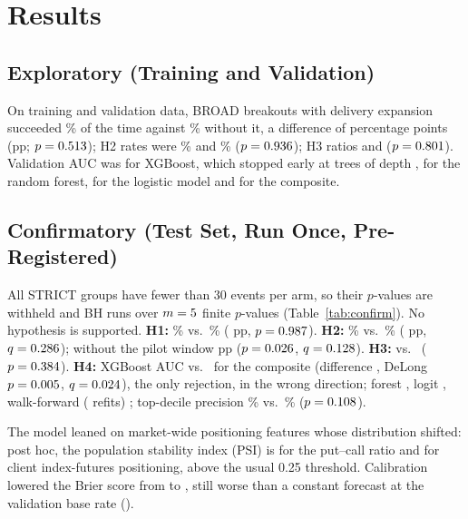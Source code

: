 \documentclass[conference]{IEEEtran}
\begin{document}


\section{Results}
\subsection{Exploratory (Training and Validation)}
On training and validation data, BROAD breakouts with delivery expansion succeeded \TvHOneExp\% of the time
against \TvHOneRest\% without it, a difference of \TvHOneDiff{} percentage points (pp; $p=0.513$); H2 rates were \TvHTwoExp\% and
\TvHTwoRest\% ($p=0.936$); H3 ratios \TvHThreeExp{} and \TvHThreeRest{} ($p=0.801$). Validation AUC
was \ValAUCxgb{} for XGBoost, which stopped early at \XgbTrees{} trees of depth \XgbDepth, \ValAUCrf{} for the
random forest, \ValAUClogit{} for the logistic model and \ValAUCcomp{} for the composite.

\subsection{Confirmatory (Test Set, Run Once, Pre-Registered)}
All STRICT groups have fewer than 30 events per arm, so their $p$-values are withheld and BH runs over
$m=5$ finite $p$-values (Table~\ref{tab:confirm}). No hypothesis is supported. \textbf{H1:} \HOneExp\% vs.\
\HOneRest\% (\HOneDiff{} pp, $p=0.987$). \textbf{H2:} \HTwoExp\% vs.\ \HTwoRest\% (\HTwoDiff{} pp,
$q=0.286$); without the pilot window \NPHTwoDiff{} pp ($p=0.026$, $q=0.128$). \textbf{H3:}
\HThreeExp{} vs.\ \HThreeRest{} ($p=0.384$). \textbf{H4:} XGBoost AUC \AUCxgb{} vs.\ \AUCcomp{} for the
composite (difference \HFourDiff, DeLong $p=0.005$, $q=0.024$), the only rejection, in the wrong
direction; forest \AUCrf, logit \AUClogit, walk-forward (\WFMonths{} refits) \WFAUC; top-decile precision
\TopMLPrec\% vs.\ \TopCompPrec\% ($p=0.108$).

The model leaned on market-wide positioning features whose distribution shifted: post hoc, the population
stability index (PSI) is \PSIpcr{} for the put--call ratio and \PSIclient{} for client index-futures
positioning, above the usual 0.25 threshold. Calibration lowered the Brier score \cite{brier1950} from
\BrierRaw{} to \BrierCal, still worse than a constant forecast at the validation base rate (\BrierConstVal).
\end{document}
